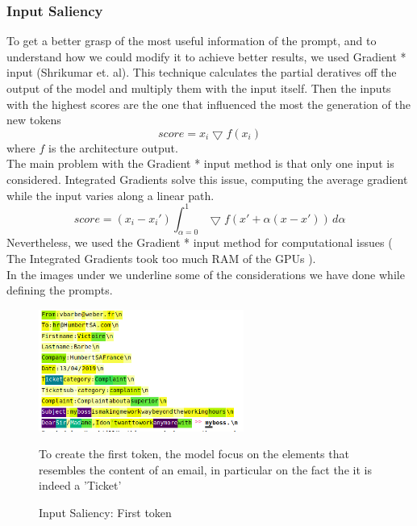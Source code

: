 \subsubsection*{Input Saliency}
To get a better grasp of the most useful information of the prompt, and to understand how we could modify it to achieve better results, we used Gradient * input (Shrikumar et. al). This technique calculates the partial deratives off the output of the model and multiply them with the input itself. Then the inputs with the highest scores are the one that influenced the most the generation of the new tokens
\begin{equation*}
    score = x_i \bigtriangledown f(x_i)
\end{equation*}
where $f$ is the architecture output. \\
The main problem with the Gradient * input method is that only one input is considered. Integrated Gradients solve this issue, computing the average gradient while the input varies along a linear path.
\begin{equation*}
    score = (x_i - x_i')\int_{\alpha = 0}^{1} \bigtriangledown f(x' + \alpha(x - x')) \,d\alpha 
\end{equation*}
Nevertheless, we used the Gradient * input method for computational issues ( The Integrated Gradients took too much RAM of the GPUs ).\\
In the images under we underline some of the considerations we have done while defining the prompts.

\begin{figure}[h!] 
    \includegraphics[width=0.6\textwidth]{images/Screenshot from 2022-11-26 17-19-27}
    \caption{Input Saliency: First token}
    \medskip
    \footnotesize
    To create the first token, the model focus on the elements that resembles the content of an email, in particular on the fact the it is indeed a 'Ticket'
    \label{fig:first_token}
\end{figure}    

